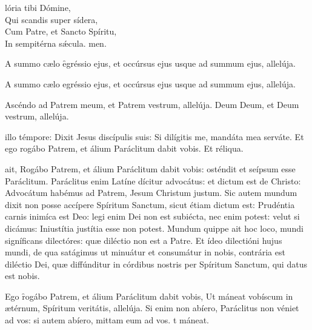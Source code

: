 \documentclass[fontsize=9pt,paper=A6,twoside,BCOR=1mm,DIV=22,headinclude]{scrarticle}
\begin{document}
\begin{multicols}{2}
\begin{hymnus}
lória tibi Dómine,\\
Qui scandis super sídera,\\
Cum Patre, et Sancto Spíritu,\\
In sempitérna sǽcula.
men.
\end{hymnus}


\A A summo cælo \f egréssio ejus, et occúrsus ejus usque ad summum ejus, allelúja.











{


\A A summo cælo egréssio ejus, et occúrsus ejus usque ad summum ejus, allelúja.

\V Ascéndo ad Patrem meum, et Patrem vestrum, allelúja.
\R Deum Deum, et Deum vestrum, allelúja.

\Evangelicalectio 

}
 illo témpore: Dixit Jesus discípulis suis: Si dilígitis me, mandáta mea serváte. Et ego rogábo Patrem, et álium Paráclitum dabit vobis. Et réliqua.

 ait, Rogábo Patrem, et álium Paráclitum dabit vobis: osténdit et seípsum esse Paráclitum. Paráclitus enim Latíne dícitur advocátus: et dictum est de Christo: Advocátum habémus ad Patrem, Jesum Christum justum. Sic autem mundum dixit non posse accípere Spíritum Sanctum, sicut étiam dictum est: Prudéntia carnis inimíca est Deo: legi enim Dei non est subiécta, nec enim potest: velut si dicámus: Iniustítia justítia esse non potest. Mundum quippe ait hoc loco, mundi signíficans dilectóres: quæ diléctio non est a Patre. Et ídeo dilectióni hujus mundi, de qua satágimus ut minuátur et consumátur in nobis, contrária est diléctio Dei, quæ diffúnditur in córdibus nostris per Spíritum Sanctum, qui datus est nobis.

\R Ego \f rogábo Patrem, et álium Paráclitum dabit vobis,
\red{*} Ut máneat vobíscum in ætérnum, Spíritum veritátis, allelúja.
\V Si enim non abíero, Paráclitus non véniet ad vos: si autem abíero, mittam eum ad vos.
t máneat.


\end{multicols}
\end{document}
